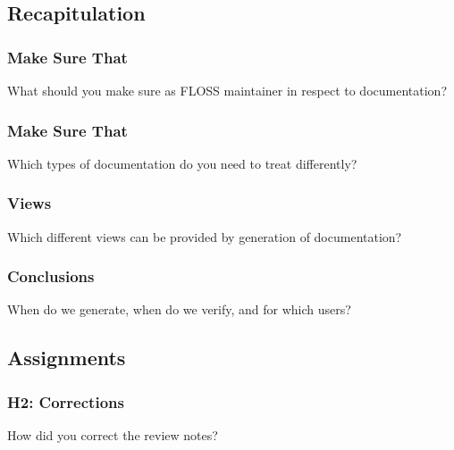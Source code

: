 \subsection{Recapitulation}


\begin{frame}
	\frametitle{Make Sure That}

	\begin{task}
	What should you make sure as FLOSS maintainer in respect to documentation?
	\end{task}
\end{frame}


\begin{frame}
	\frametitle{Make Sure That}

	\begin{task}
	Which types of documentation do you need to treat differently?
	\end{task}
\end{frame}


\breakframe

\begin{frame}
	\frametitle{Views}

	\begin{task}
	Which different views can be provided by generation of documentation?
	\end{task}
\end{frame}


\begin{frame}
	\frametitle{Conclusions}

	\begin{task}
	When do we generate, when do we verify, and for which users?
	\end{task}
\end{frame}



\subsection{Assignments}

\begin{assignment}
	\frametitle{H2: Corrections}

	\begin{task}
	How did you correct the review notes?
	\end{task}
\end{assignment}

